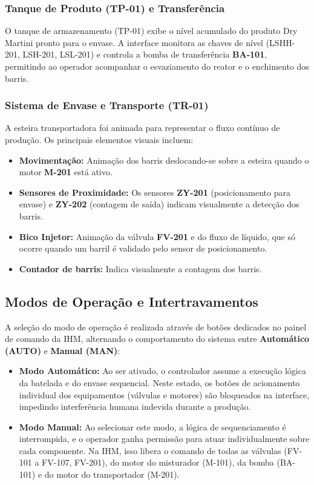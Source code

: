 \subsubsection{Tanque de Produto (TP-01) e Transferência}
O tanque de armazenamento (TP-01) exibe o nível acumulado do produto Dry Martini pronto para o envase. A interface monitora as chaves de nível (LSHH-201, LSH-201, LSL-201) e controla a bomba de transferência \textbf{BA-101}, permitindo ao operador acompanhar o esvaziamento do reator e o enchimento dos barris.

\subsubsection{Sistema de Envase e Transporte (TR-01)}
A esteira transportadora foi animada para representar o fluxo contínuo de produção. Os principais elementos visuais incluem:
\begin{itemize}
    \item \textbf{Movimentação:} Animação dos barris deslocando-se sobre a esteira quando o motor \textbf{M-201} está ativo.
    \item \textbf{Sensores de Proximidade:} Os sensores \textbf{ZY-201} (posicionamento para envase) e \textbf{ZY-202} (contagem de saída) indicam visualmente a detecção dos barris.
    \item \textbf{Bico Injetor:} Animação da válvula \textbf{FV-201} e do fluxo de líquido, que só ocorre quando um barril é validado pelo sensor de posicionamento.
    \item \textbf{Contador de barris:} Indica visualmente a contagem dos barris.
\end{itemize}

\subsection{Modos de Operação e Intertravamentos}

A seleção do modo de operação é realizada através de botões dedicados no painel de comando da IHM, alternando o comportamento do sistema entre \textbf{Automático (AUTO)} e \textbf{Manual (MAN)}:

\begin{itemize}
    \item \textbf{Modo Automático:} Ao ser ativado, o controlador assume a execução lógica da batelada e do envase sequencial. Neste estado, os botões de acionamento individual dos equipamentos (válvulas e motores) são bloqueados na interface, impedindo interferência humana indevida durante a produção.
    
    \item \textbf{Modo Manual:} Ao selecionar este modo, a lógica de sequenciamento é interrompida, e o operador ganha permissão para atuar individualmente sobre cada componente. Na IHM, isso libera o comando de todas as válvulas (FV-101 a FV-107, FV-201), do motor do misturador (M-101), da bomba (BA-101) e do motor do transportador (M-201).
\end{itemize}

